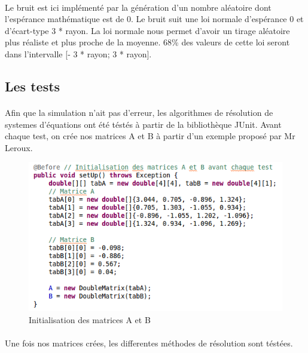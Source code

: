 \documentclass[a4paper,11pt]{article}
\begin{document}
		\paragraph{}
		Le bruit est ici implémenté par la génération d'un nombre aléatoire dont l’espérance mathématique est de 0. Le bruit suit une loi normale d'espérance 0 et d'écart-type 3 * rayon. La loi normale nous permet d'avoir un tirage aléatoire plus réaliste et plus proche de la moyenne. 68\% des valeurs de cette loi seront dans l'intervalle [- 3 * rayon; 3 * rayon].  
		

		\newpage

		\subsection{Les tests}
		\paragraph{}
		Afin que la simulation n'ait pas d'erreur, les algorithmes de résolution de systemes d'équations ont été téstés à partir de la bibliothèque JUnit.
		Avant chaque test, on crée nos matrices A et B à partir d'un exemple proposé par Mr Leroux.

		\begin{figure}[h]
			\centerline{\includegraphics[scale=0.50]{img/testInit.png}}
			\caption{Initialisation des matrices A et B}
			\label{diagramme-composants}
		\end{figure} 

		\paragraph{}
		Une fois nos matrices crées, les differentes méthodes de résolution sont téstées.
\end{document}
